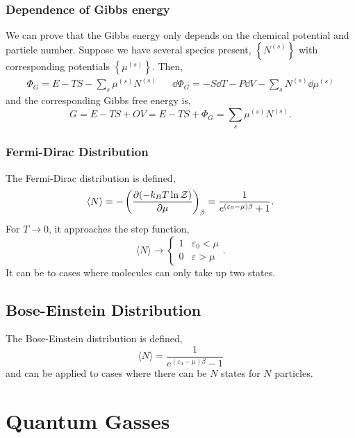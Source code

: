 \documentclass{book}
\begin{document}
\subsection{Dependence of Gibbs energy}
We can prove that the Gibbs energy only depends on the chemical potential and particle number. Suppose we have several species present, $\left\{N^{(s)}\right\}$ with corresponding potentials $\left\{\mu^{(s)}\right\}$. Then,
\begin{align}
	\Phi_G = E - TS - \sum_s\mu^{(s)}N^{(s)} && \dd{\Phi_G} = - S\dd{T} - P\dd{V} - \sum_sN^{(s)}\dd{\mu}^{(s)}
\end{align}
and the corresponding Gibbs free energy is,
\begin{equation}
	G = E - TS + OV = E - TS + \Phi_G = \sum_s\mu^{(s)}N^{(s)}.
\end{equation}
\subsection{Fermi-Dirac Distribution}
The Fermi-Dirac distribution is defined,
\begin{equation}
	\langle N \rangle = -\left(\pdv{(-k_BT\ln\mathcal{Z})}{\mu}\right)_{\beta} = \frac{1}{e^{(\varepsilon_0 - \mu)\beta} + 1}.
\end{equation}
For $T \to 0$, it approaches the step function,
\begin{equation}
	\langle N \rangle \to \begin{cases}1 & \varepsilon_0 < \mu \\ 0 & \varepsilon > \mu\end{cases}.
\end{equation}
It can be to cases where molecules can only take up two states.
\section{Bose-Einstein Distribution}
The Bose-Einstein distribution is defined,
\begin{equation}
	\langle N \rangle = \frac{1}{e^{(\varepsilon_0 - \mu)\beta} - 1}
\end{equation}
and can be applied to cases where there can be $N$ states for $N$ particles.
\chapter{Quantum Gasses}
\end{document}
